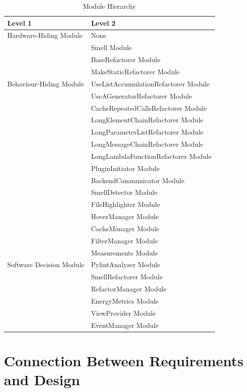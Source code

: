 \documentclass[12pt, titlepage]{article}
\begin{document}
\begin{table}[h!]
  \centering
  \begin{tabular}{p{} p{}}
  \toprule
  \textbf{Level 1} & \textbf{Level 2}\\
  \midrule
  
  {Hardware-Hiding Module} & None \\
  \midrule
  
  \multirow{7}{0.3\textwidth}{Behaviour-Hiding Module} & Smell Module\\
  & BaseRefactorer Module\\
  & MakeStaticRefactorer Module\\
  & UseListAccumulationRefactorer Module\\
  & UseAGeneratorRefactorer Module\\
  & CacheRepeatedCallsRefactorer Module\\
  & LongElementChainRefactorer Module\\
  & LongParameterListRefactorer Module\\
  & LongMessageChainRefactorer Module\\
  & LongLambdaFunctionRefactorer Module\\ 
  & PluginInitiator Module\\
  & BackendCommunicator Module\\ 
  & SmellDetector Module\\
  & FileHighlighter Module\\
  & HoverManager Module\\
  & CacheManager Module\\
  & FilterManager Module\\
  \midrule


  \multirow{3}{0.3\textwidth}{Software Decision Module} & Measurements Module\\
& PylintAnalyzer Module\\
& SmellRefactorer Module\\
& RefactorManager Module\\
& EnergyMetrics Module\\
& ViewProvider Module\\
& EventManager Module\\
\bottomrule

\end{tabular}
\caption{Module Hierarchy}
\label{TblMH}
\end{table}

\section{Connection Between Requirements and Design} \label{SecConnection}
\end{document}
